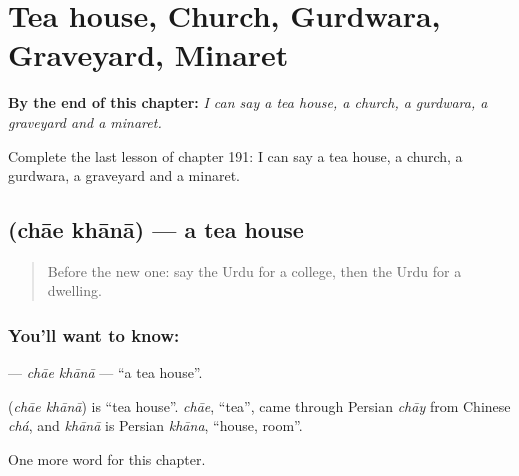 
\chapter{Tea house, Church, Gurdwara, Graveyard, Minaret}
\label{ch:ur-tea-house-church-gurdwara-graveyard-minaret}

\begin{chapteropening}
\textbf{By the end of this chapter:} \emph{I can say a tea house, a church, a gurdwara, a graveyard and a minaret.}

Complete the last lesson of chapter 191: I can say a tea house, a church, a gurdwara, a graveyard and a minaret.
\end{chapteropening}

\section[\texorpdfstring{\ur{چائے} \ur{خانہ} (chāe khānā)}{چائے خانہ (chāe khānā)}]{  (chāe khānā) — a tea house}

\label{lesson:UR-C191-chae-khana}



\begin{quote}
Before the new one: say the Urdu for a college, then the Urdu for a dwelling.
\end{quote}

\subsection*{You'll want to know:  }
\textbf{ } — \emph{chāe khānā} — \textquotedblleft{}a tea house\textquotedblright{}.

\begin{cousinweb}
\textbf{ } (\emph{chāe khānā}) is \textquotedblleft{}tea house\textquotedblright{}. \emph{chāe}, \textquotedblleft{}tea\textquotedblright{}, came through Persian \emph{chāy} from Chinese \emph{chá}, and \emph{khānā} is Persian \emph{khāna}, \textquotedblleft{}house, room\textquotedblright{}.
\end{cousinweb}

\begin{grammarlens}[title={What you've built}]
One more word for this chapter.
\end{grammarlens}

